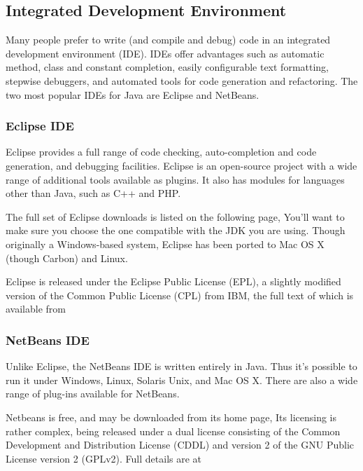 \subsection{Integrated Development Environment}

Many people prefer to write (and compile and debug) code in an
integrated development environment (IDE).  IDEs offer advantages such
as automatic method, class and constant completion, easily
configurable text formatting, stepwise debuggers, and automated tools
for code generation and refactoring.
The two most popular IDEs for Java are Eclipse and NetBeans.

\subsubsection{Eclipse IDE}

Eclipse provides a full range of code checking, auto-completion
and code generation, and debugging facilities.  Eclipse is an open-source
project with a wide range of additional tools available as plugins.  It
also has modules for languages other than Java, such as C++ and PHP.

The full set of Eclipse downloads is listed on the following page,
%
%
You'll want to make sure you choose the one compatible with the JDK
you are using.  Though originally a Windows-based system, Eclipse has been
ported to Mac OS X (though Carbon) and Linux.  

Eclipse is released under the Eclipse Public License (EPL), a slightly modified
version of the Common Public License (CPL) from IBM, the full text of which is
available from
%


\subsubsection{NetBeans IDE}

Unlike Eclipse, the NetBeans IDE is written entirely in Java.  Thus
it's possible to run it under Windows, Linux, Solaris Unix, and Mac OS
X. There are also a wide range of plug-ins available for NetBeans.

Netbeans is free, and may be downloaded from its home page,
%
%
Its licensing is rather complex, being released under a dual license
consisting of the Common Development and Distribution License (CDDL)
and version 2 of the GNU Public License version 2 (GPLv2).  Full details
are at
%


